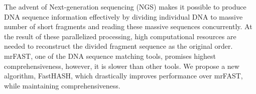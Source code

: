 The advent of Next-generation sequencing (NGS) makes it possible to produce DNA
sequence information effectively by dividing individual DNA to massive number
of short fragments and reading these massive sequences concurrently. At the
result of these parallelized processing, high computational resources are
needed to reconstruct the divided fragment sequence as the original order.
mrFAST, one of the DNA sequence matching tools, promises highest
comprehensiveness, however, it is slower than other tools. We propose a new
algorithm, FastHASH, which drastically improves performance over mrFAST, while
maintaining comprehensiveness.\\
